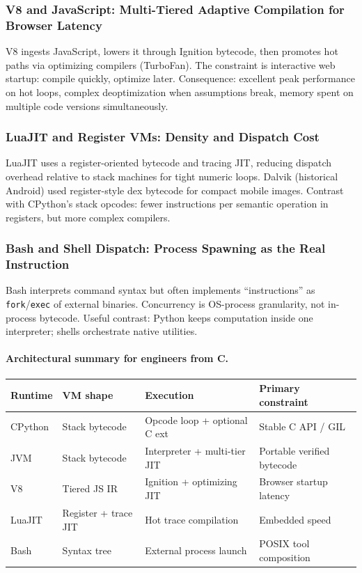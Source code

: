 \documentclass[a4paper,twoside]{report}
\begin{document}
\subsubsection{V8 and JavaScript: Multi-Tiered Adaptive Compilation for Browser Latency}

V8 ingests JavaScript, lowers it through Ignition bytecode, then promotes hot paths via optimizing compilers (TurboFan). The constraint is interactive web startup: compile quickly, optimize later. Consequence: excellent peak performance on hot loops, complex deoptimization when assumptions break, memory spent on multiple code versions simultaneously.

\subsubsection{LuaJIT and Register VMs: Density and Dispatch Cost}

LuaJIT uses a register-oriented bytecode and tracing JIT, reducing dispatch overhead relative to stack machines for tight numeric loops. Dalvik (historical Android) used register-style dex bytecode for compact mobile images. Contrast with CPython's stack opcodes: fewer instructions per semantic operation in registers, but more complex compilers.

\subsubsection{Bash and Shell Dispatch: Process Spawning as the Real Instruction}

Bash interprets command syntax but often implements ``instructions'' as \texttt{fork}/\texttt{exec} of external binaries. Concurrency is OS-process granularity, not in-process bytecode. Useful contrast: Python keeps computation inside one interpreter; shells orchestrate native utilities.

\paragraph{Architectural summary for engineers from C.}
\begin{center}
\begin{tabular}{|l|l|l|l|}
\hline
\textbf{Runtime} & \textbf{VM shape} & \textbf{Execution} & \textbf{Primary constraint} \\
\hline
CPython & Stack bytecode & Opcode loop + optional C ext & Stable C API / GIL \\
JVM & Stack bytecode & Interpreter + multi-tier JIT & Portable verified bytecode \\
V8 & Tiered JS IR & Ignition + optimizing JIT & Browser startup latency \\
LuaJIT & Register + trace JIT & Hot trace compilation & Embedded speed \\
Bash & Syntax tree & External process launch & POSIX tool composition \\
\hline
\end{tabular}
\end{center}
\end{document}
